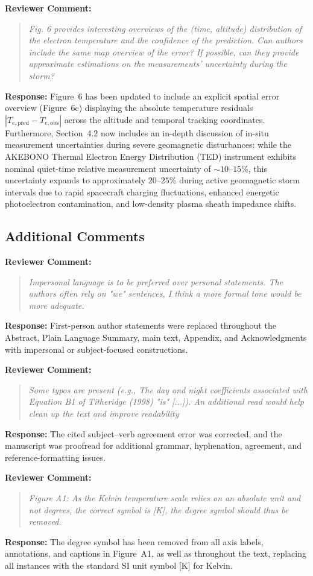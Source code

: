 \documentclass[a4paper,12pt]{article}
\newcommand{\reviewercomment}[1]{%
  \begin{samepage}%
  \par\noindent\textbf{Reviewer Comment:}\par
  \begin{quote}\itshape #1\end{quote}}
\newcommand{\filledresponse}[1]{%
  \par\noindent\textbf{Response:} #1\par
  \vspace{0.4cm}%
  \end{samepage}}
\begin{document}
\reviewercomment{Fig. 6 provides interesting overviews of the (time, altitude) distribution of the electron
temperature and the confidence of the prediction. Can authors include the same map overview of the
error? If possible, can they provide approximate estimations on the measurements' uncertainty during
the storm?}
\filledresponse{Figure~6 has been updated to include an explicit spatial error overview (Figure~6c) displaying the absolute temperature residuals $|T_{e,\text{pred}} - T_{e,\text{obs}}|$ across the altitude and temporal tracking coordinates. Furthermore, Section~4.2 now includes an in-depth discussion of in-situ measurement uncertainties during severe geomagnetic disturbances: while the AKEBONO Thermal Electron Energy Distribution (TED) instrument exhibits nominal quiet-time relative measurement uncertainty of $\sim 10$--$15\%$, this uncertainty expands to approximately $20$--$25\%$ during active geomagnetic storm intervals due to rapid spacecraft charging fluctuations, enhanced energetic photoelectron contamination, and low-density plasma sheath impedance shifts.}

\subsection*{Additional Comments}

\reviewercomment{Impersonal language is to be preferred over personal statements. The authors often rely on "we"
sentences, I think a more formal tone would be more adequate.}
\filledresponse{First-person author statements were replaced throughout the Abstract, Plain
Language Summary, main text, Appendix, and Acknowledgments with impersonal or subject-focused
constructions.}

\reviewercomment{Some typos are present (e.g., The day and night coefficients associated with Equation B1 of
Titheridge (1998) "is" [...]). An additional read would help clean up the text and improve
readability}
\filledresponse{The cited subject--verb agreement error was corrected, and the manuscript was
proofread for additional grammar, hyphenation, agreement, and reference-formatting issues.}

\reviewercomment{Figure A1: As the Kelvin temperature scale relies on an absolute unit and not degrees, the correct
symbol is [K], the degree symbol should thus be removed.}
\filledresponse{The degree symbol has been removed from all axis labels, annotations, and captions in Figure~A1, as well as throughout the text, replacing all instances with the standard SI unit symbol [K] for Kelvin.}
\end{document}
